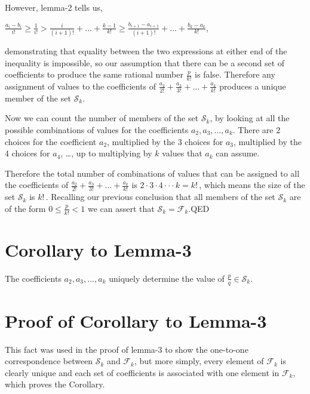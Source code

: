 \documentclass{article}
\begin{document}
However, lemma-2 tells us,\par
\begin{center}
\(\frac{a_i - b_i}{i!} \ge{} \frac{1}{i!} > \frac{i}{(i+1)!} + \dots{} + \frac{k-1}{k!} \ge{} \frac{b_{i+1} - a_{i+1}}{(i+1)!} + \dots{} + \frac{b_k - a_k}{k!}\),
\end{center}\par
demonstrating that equality between the two expressions at either end of the inequality
is impossible, so our assumption that there can be a second set
of coefficients to produce the same rational number \(\frac{p}{k!}\) is false.
Therefore any assignment of values to the coefficients of
\(\frac{a_2}{2!} + \frac{a_3}{3!} + \dots{} + \frac{a_k}{k!}\)
produces a unique member of the set \(\mathcal{S}_k\).

Now we can count the number of members of the set \(\mathcal{S}_k\), by looking at all the
possible combinations of values for the coefficients \(a_2, a_3, \dots{}, a_k\).
There are 2 choices for the coefficient \(a_2\),
multiplied by the 3 choices for \(a_3\),
multiplied by the 4 choices for \(a_4\),
\dots{},
up to multiplying by \(k\) values that \(a_k\) can assume.

Therefore the total number of combinations of values
that can be assigned to all the coefficients of \(\frac{a_2}{2!} + \frac{a_3}{3!} + \dots{} + \frac{a_k}{k!}\)
is \(2\cdot{}3\cdot{}4\cdot\cdot{}\cdot{}k = k!\,\),
which means the size of the set \(\mathcal{S}_k\) is \(k!\, \). Recalling our previous conclusion that
all members of the set \(\mathcal{S}_k\) are of the form \(0\le{}\frac{p}{k!}<1\) we
can assert that \(\mathcal{S}_k = \mathcal{F}_k\).\qquad QED

\section*{Corollary to Lemma-3}

The coefficients \(a_2, a_3, \dots{}, a_k\) uniquely determine the value of 
\(\frac{p}{q} \in{} \mathcal{S}_k\).

\section*{Proof of Corollary to Lemma-3}

This fact was used in the proof of lemma-3 to show the one-to-one
correspondence between \(\mathcal{S}_k\) and \(\mathcal{F}_k\), but
more simply, every element of \(\mathcal{F}_k\) is clearly unique and each
set of coefficients is associated with one element in \(\mathcal{F}_k\), which
proves the Corollary.
\end{document}
